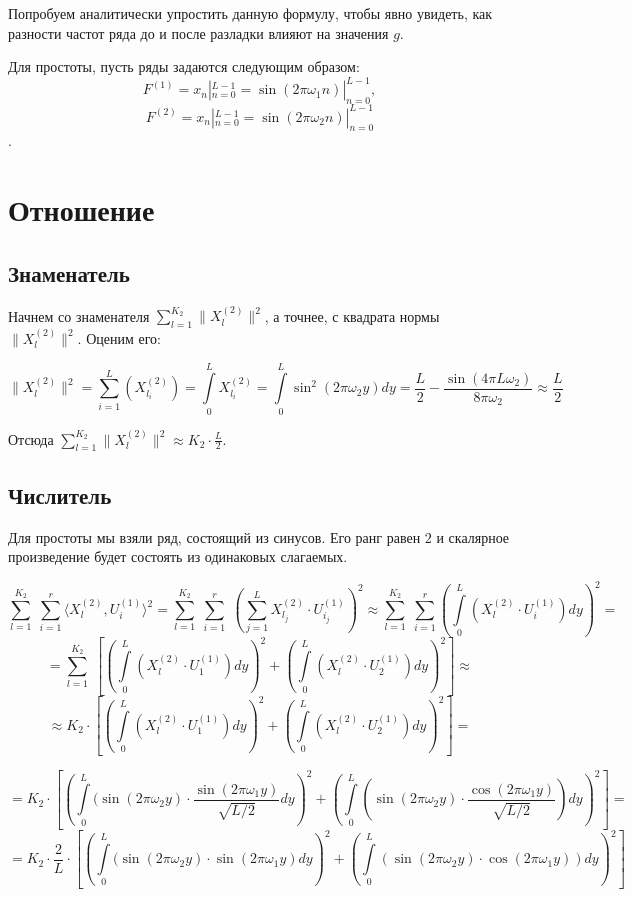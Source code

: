 \documentclass[specialist, substylefile = spbu.rtx,
			   subf, href, 12pt]{disser}
\begin{document}
Попробуем аналитически упростить данную формулу, чтобы явно увидеть, как разности частот ряда до и после разладки влияют на значения $ g $.

Для простоты, пусть ряды задаются следующим образом: 
$$F^{(1)} = x_n|_{n=0}^{L-1} = \sin(2\pi\omega_1 n)|_{n=0}^{L-1},$$ $$F^{(2)} = x_n|_{n=0}^{L-1} = \sin(2\pi\omega_2 n)|_{n=0}^{L-1}$$.

\section{Отношение}
\subsection{Знаменатель}
Начнем со знаменателя $\sum\limits_{l=1}^{K_2}\|X_l^{(2)}\|^2$, а точнее, с квадрата нормы $\|X_l^{(2)}\|^2$. Оценим его:

$$ \|X_l^{(2)}\|^2 = \sum\limits_{i=1}^{L}(X_{l_i}^{(2)}) = \int\limits_{0}^{L}X_{l_i}^{(2)} = \int\limits_{0}^{L}\sin^2{(2\pi\omega_2 y)}dy = \frac{L}{2} - \frac{\sin(4\pi L\omega_2)}{8\pi\omega_2} \approx \frac{L}{2} $$

Отсюда $\sum\limits_{l=1}^{K_2}\|X_l^{(2)}\|^2 \approx K_2\cdot\frac{L}{2}$.


\subsection{Числитель}
Для простоты мы взяли ряд, состоящий из синусов. Его ранг равен $ 2 $ и скалярное произведение будет состоять из одинаковых слагаемых.



$$ \sum\limits_{l=1}^{K_2}\;\sum\limits_{i=1}^{r}\langle X_l^{(2)}, U_i^{(1)}\rangle^2 = \sum\limits_{l=1}^{K_2}\;\sum\limits_{i=1}^{r}\;\left (\sum\limits_{j=1}^{L}X_{l_j}^{(2)}\cdot U_{i_j}^{(1)}\right )^2 \approx \sum\limits_{l=1}^{K_2}\;\sum\limits_{i=1}^{r} \left (\int\limits_{0}^{L}(X_{l}^{(2)} \cdot U_{i}^{(1)})dy\right )^2 = $$
$$ = \sum\limits_{l=1}^{K_2}\;\left[\left(\int\limits_{0}^{L}(X_{l}^{(2)} \cdot U_{1}^{(1)})dy\right )^2 + \left(\int\limits_{0}^{L}(X_{l}^{(2)} \cdot U_{2}^{(1)})dy\right )^2\right ] \approx $$ 
$$ \approx K_2 \cdot\left[\left(\int\limits_{0}^{L}(X_{l}^{(2)} \cdot U_{1}^{(1)})dy\right )^2 + \left(\int\limits_{0}^{L}(X_{l}^{(2)} \cdot U_{2}^{(1)})dy\right )^2\right ] = $$

$$ = K_2 \cdot\left[\left(\int\limits_{0}^{L}(\sin(2\pi\omega_2 y) \cdot \frac{\sin(2\pi\omega_1 y)}{\sqrt{L/2}}dy\right )^2 + \left(\int\limits_{0}^{L}(\sin(2\pi\omega_2 y) \cdot \frac{\cos(2\pi\omega_1 y)}{\sqrt{L/2}})dy\right )^2\right ] = $$ 
$$ = K_2 \cdot \frac{2}{L} \cdot\left[\left(\int\limits_{0}^{L}(\sin(2\pi\omega_2 y) \cdot \sin(2\pi\omega_1 y)dy\right )^2 + \left(\int\limits_{0}^{L}(\sin(2\pi\omega_2 y) \cdot \cos(2\pi\omega_1 y))dy\right )^2\right ] $$
\end{document}
